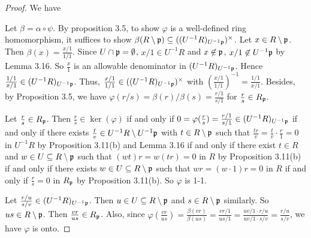 \begin{proof}
    We have 
    \begin{center}
    \end{center}
    Let $\beta = \alpha \circ \psi$. By proposition 3.5, to show $\varphi$ is a well-defined ring homomorphism, it suffices to show $\beta(R \setminus \mathfrak{p}) \subseteq ((U^{-1}R)_{U^{-1}\mathfrak{p}})^{\times}$. Let $x \in R \setminus \mathfrak{p}$. Then $\beta(x) = \frac{x/1}{1/1}$. Since $U \cap \mathfrak{p} = \emptyset$, $x/1 \in U^{-1}R$ and $x \not \in \mathfrak{p}$, $x/1 \not \in U^{-1}\mathfrak{p}$ by Lemma 3.16. So $\frac{x}{1}$ is an allowable denominator in $(U^{-1}R)_{U^{-1}\mathfrak{p}}$. Hence $\frac{1/1}{x/1} \in (U^{-1}R)_{U^{-1}\mathfrak{p}}$. Thus, $\frac{x/1}{1/1} \in ((U^{-1}R)_{U^{-1}\mathfrak{p}})^{\times}$ with $(\frac{x/1}{1/1})^{-1} = \frac{1/1}{x/1}$. Besides, by Proposition 3.5, we have $\varphi(r/s) = \beta(r)/\beta(s) = \frac{r/1}{s/1}$ for $\frac{r}{s} \in R_{\mathfrak{p}}$. \par 
    Let $\frac{r}{s} \in R_{\mathfrak{p}}$. Then $\frac{r}{s} \in \ker(\varphi)$ if and only if $0 = \varphi(\frac{r}{s}) = \frac{r/1}{s/1} \in (U^{-1}R)_{U^{-1}\mathfrak{p}}$ if and only if there exists $\frac{t}{v} \in U^{-1}R \setminus U^{-1}\mathfrak{p}$ with $t \in R \setminus \mathfrak{p}$ such that $\frac{tr}{v} = \frac{t}{v} \cdot \frac{r}{1} = 0$ in $U^{-1}R$ by Proposition 3.11(b) and Lemma 3.16 if and only if there exist $t \in R$ and $w \in U \subseteq R \setminus \mathfrak{p}$ such that $(wt)r =  w(tr) = 0$ in $R$ by Proposition 3.11(b) if and only if there exists $w \in U \subseteq R \setminus \mathfrak{p}$ such that $wr = (w \cdot 1)r = 0$ in $R$ if and only if $\frac{r}{s} = 0$ in $R_{\mathfrak{p}}$ by Proposition 3.11(b). So $\varphi$ is 1-1. \par 
    Let $\frac{r/u}{s/v} \in (U^{-1}R)_{U^{-1}\mathfrak{p}}$. Then $u \in U \subseteq R \setminus \mathfrak{p}$ and $s \in R \setminus \mathfrak{p}$ similarly. So $us \in R \setminus \mathfrak{p}$. Then $\frac{vr}{us} \in R_{\mathfrak{p}}$. Also, since $\varphi(\frac{vr}{us}) = \frac{\beta(vr)}{\beta(us)} = \frac{vr/1}{us/1} = \frac{uv/1 \cdot r/u}{uv/1 \cdot s/v} = \frac{r/u}{s/v}$, we have $\varphi$ is onto. 
\end{proof}

